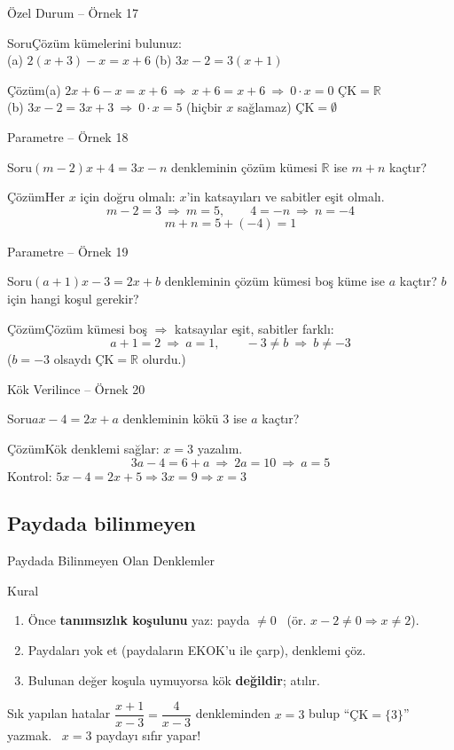 \documentclass[aspectratio=169,11pt]{beamer}
\newcommand{\soru}[3]{%
\begin{frame}{#1}
  \begin{block}{Soru}\large #2\end{block}
  \pause
  \begin{exampleblock}{Çözüm}\large #3\end{exampleblock}
\end{frame}}
\begin{document}
\soru{Özel Durum -- Örnek 17}
{Çözüm kümelerini bulunuz:\\[3pt] (a) \(2(x+3)-x=x+6\) \qquad\qquad (b) \(3x-2=3(x+1)\)}
{(a) \(2x+6-x=x+6\ \Rightarrow\ x+6=x+6\ \Rightarrow\ 0\cdot x=0\) \quad \(\text{ÇK}=\mathbb{R}\)\\[4pt]
(b) \(3x-2=3x+3\ \Rightarrow\ 0\cdot x=5\) \quad (hiçbir \(x\) sağlamaz) \quad \(\text{ÇK}=\emptyset\)}

\soru{Parametre -- Örnek 18}
{\((m-2)x+4=3x-n\) denkleminin çözüm kümesi \(\mathbb{R}\) ise \(m+n\) kaçtır?}
{Her \(x\) için doğru olmalı: \(x\)'in katsayıları ve sabitler eşit olmalı.
\[m-2=3\ \Rightarrow\ m=5,\qquad 4=-n\ \Rightarrow\ n=-4\]
\[m+n=5+(-4)=1\]}

\soru{Parametre -- Örnek 19}
{\((a+1)x-3=2x+b\) denkleminin çözüm kümesi boş küme ise \(a\) kaçtır? \(b\) için hangi koşul gerekir?}
{Çözüm kümesi boş \(\Rightarrow\) katsayılar eşit, sabitler farklı:
\[a+1=2\ \Rightarrow\ a=1,\qquad -3\neq b\ \Rightarrow\ b\neq-3\]
(\(b=-3\) olsaydı \(\text{ÇK}=\mathbb{R}\) olurdu.)}

\soru{Kök Verilince -- Örnek 20}
{\(ax-4=2x+a\) denkleminin kökü \(3\) ise \(a\) kaçtır?}
{Kök denklemi sağlar: \(x=3\) yazalım.
\[3a-4=6+a\ \Rightarrow\ 2a=10\ \Rightarrow\ a=5\]
Kontrol: \(5x-4=2x+5\Rightarrow 3x=9\Rightarrow x=3\) \checkmark}

\subsection{Paydada bilinmeyen}
\begin{frame}{Paydada Bilinmeyen Olan Denklemler}
\begin{block}{Kural}
\begin{enumerate}
\item Önce \textbf{tanımsızlık koşulunu} yaz: payda \(\neq 0\) \ (ör. \(x-2\neq 0\Rightarrow x\neq 2\)).
\item Paydaları yok et (paydaların EKOK'u ile çarp), denklemi çöz.
\item Bulunan değer koşula uymuyorsa kök \textbf{değildir}; atılır.
\end{enumerate}
\end{block}
\begin{alertblock}{Sık yapılan hatalar}
\(\dfrac{x+1}{x-3}=\dfrac{4}{x-3}\) denkleminden \(x=3\) bulup ``\(\text{ÇK}=\{3\}\)'' yazmak. \ \(x=3\) paydayı sıfır yapar!
\end{alertblock}
\end{frame}
\end{document}
